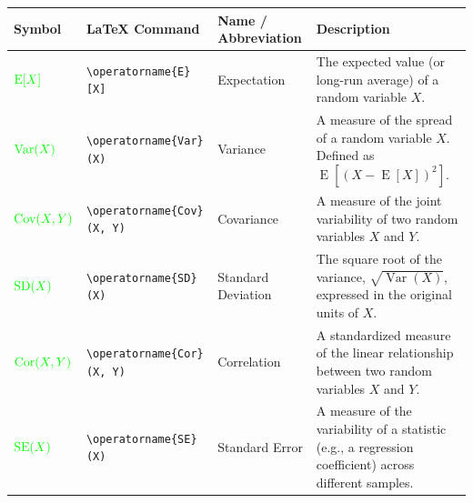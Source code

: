 \documentclass[
  letterpaper,
  DIV=11,
  numbers=noendperiod]{scrartcl}
\begin{document}
\begin{longtable}[]{@{}
  >{\raggedright\arraybackslash}p{}
  >{\raggedright\arraybackslash}p{}
  >{\raggedright\arraybackslash}p{}
  >{\raggedright\arraybackslash}p{}@{}}
\toprule\noalign{}
\begin{minipage}[b]{\linewidth}\raggedright
Symbol
\end{minipage} & \begin{minipage}[b]{\linewidth}\raggedright
LaTeX Command
\end{minipage} & \begin{minipage}[b]{\linewidth}\raggedright
Name / Abbreviation
\end{minipage} & \begin{minipage}[b]{\linewidth}\raggedright
Description
\end{minipage} \\
\midrule\noalign{}
\endhead
\bottomrule\noalign{}
\endlastfoot
\(\textcolor{green}{\operatorname{E}[X]}\) &
\texttt{\textbackslash{}operatorname\{E\}{[}X{]}} & Expectation & The
expected value (or long-run average) of a random variable \(X\). \\
\(\textcolor{green}{\operatorname{Var}(X)}\) &
\texttt{\textbackslash{}operatorname\{Var\}(X)} & Variance & A measure
of the spread of a random variable \(X\). Defined as
\(\operatorname{E}[(X - \operatorname{E}[X])^2]\). \\
\(\textcolor{green}{\operatorname{Cov}(X, Y)}\) &
\texttt{\textbackslash{}operatorname\{Cov\}(X,\ Y)} & Covariance & A
measure of the joint variability of two random variables \(X\) and
\(Y\). \\
\(\textcolor{green}{\operatorname{SD}(X)}\) &
\texttt{\textbackslash{}operatorname\{SD\}(X)} & Standard Deviation &
The square root of the variance, \(\sqrt{\operatorname{Var}(X)}\),
expressed in the original units of \(X\). \\
\(\textcolor{green}{\operatorname{Cor}(X, Y)}\) &
\texttt{\textbackslash{}operatorname\{Cor\}(X,\ Y)} & Correlation & A
standardized measure of the linear relationship between two random
variables \(X\) and \(Y\). \\
\(\textcolor{green}{\operatorname{SE}(X)}\) &
\texttt{\textbackslash{}operatorname\{SE\}(X)} & Standard Error & A
measure of the variability of a statistic (e.g., a regression
coefficient) across different samples. \\
\end{longtable}
\end{document}
